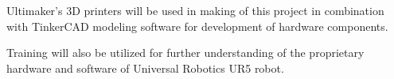 Ultimaker's 3D printers will be used in making of this project in combination with TinkerCAD modeling software for development of hardware components.

Training will also be utilized for further understanding of the proprietary hardware and software of Universal Robotics UR5 robot.